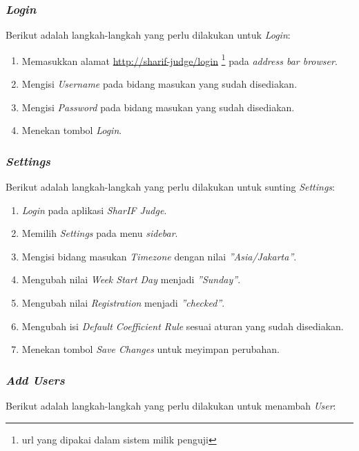 \subsubsection{\textit{Login}}
\label{subsubsec:skenario_login}
Berikut adalah langkah-langkah yang perlu dilakukan untuk \textit{Login}:

\begin{enumerate}
	\item Memasukkan alamat \url{http://sharif-judge/login} \footnote{url yang dipakai dalam sistem milik penguji} pada \textit{address bar browser}.
	\item Mengisi \textit{Username} pada bidang masukan yang sudah disediakan.
	\item Mengisi \textit{Password} pada bidang masukan yang sudah disediakan.
	\item Menekan tombol \textit{Login}.
\end{enumerate}

\subsubsection{\textit{Settings}}
\label{subsubsec:skenario_settings}
Berikut adalah langkah-langkah yang perlu dilakukan untuk sunting \textit{Settings}:

\begin{enumerate}
	\item \textit{Login} pada aplikasi \textit{SharIF Judge}.
	\item Memilih \textit{Settings} pada menu \textit{sidebar}.
	\item Mengisi bidang masukan \textit{Timezone} dengan nilai \textit{''Asia/Jakarta''}.
	\item Mengubah nilai \textit{Week Start Day} menjadi \textit{''Sunday''}.
	\item Mengubah nilai \textit{Registration} menjadi \textit{''checked''}.
	\item Mengubah isi \textit{Default Coefficient Rule} sesuai aturan yang sudah disediakan.
	\item Menekan tombol \textit{Save Changes} untuk meyimpan perubahan.
\end{enumerate}

\subsubsection{\textit{Add Users}}
\label{subsubsec:skenario_add_users}
Berikut adalah langkah-langkah yang perlu dilakukan untuk menambah \textit{User}:

